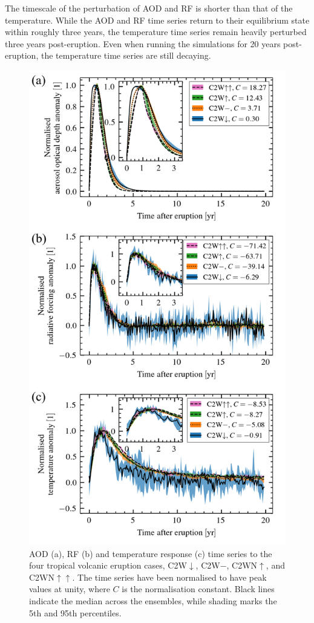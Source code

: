 \documentclass[draft]{agujournal2019}
\newcommand{\cwm}{C2W\(\downarrow\)}
\newcommand{\cwmp}{C2W\(-\)}
\newcommand{\cws}{C2WN\(\uparrow\)}
\newcommand{\cwss}{C2WN\(\uparrow\uparrow\)}
\begin{document}
The timescale of the perturbation of AOD and RF is shorter than that of the temperature.
While the AOD and RF time series return to their equilibrium state within roughly three
years, the temperature time series remain heavily perturbed three years post-eruption.
Even when running the simulations for 20 years post-eruption, the temperature time
series are still decaying.

\begin{figure}
  \centering
  \includegraphics{figures/figure1.png}

  \caption{AOD (a), RF (b) and temperature response (c) time series to the four tropical
    volcanic eruption cases, \cwm{}, \cwmp{}, \cws{}, and \cwss{}. The time series have been
    normalised to have peak values at unity, where \(C\) is the normalisation constant.
    Black lines indicate the median across the ensembles, while shading marks the 5th and
    95th percentiles.}\label{fig:1_compare_waveform}%
\end{figure}
\end{document}
